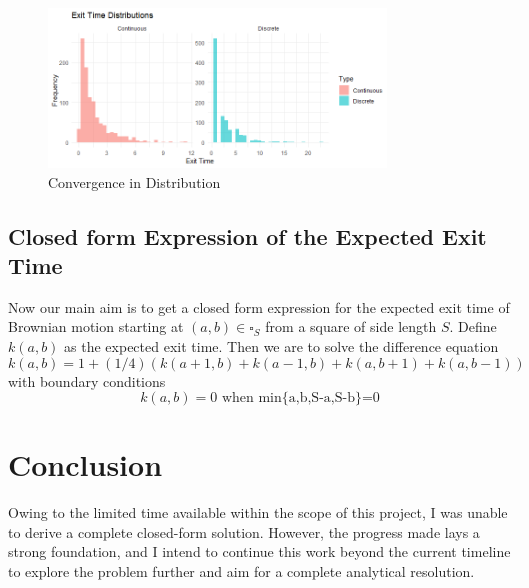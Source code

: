 \documentclass[11pt, a4paper, oneside]{report}
\numberwithin{equation}{section}
\begin{document}
\vspace{1 cm}
\begin{figure}[htbp]
    \centering
    \includegraphics[width=0.8\textwidth]{Distribution Convergence.png}
    \caption{Convergence in Distribution}
\end{figure}
\section{Closed form Expression of the Expected Exit Time}
Now our main aim is to get a closed form expression for the expected exit time of Brownian motion starting at $(a,b) \in \square_S$ from a square of side length $S$. Define $k(a,b)$ as the expected exit time. Then we are to solve the difference equation 
\[
k(a,b)=1+(1/4)(k(a+1,b)+k(a-1,b)+k(a,b+1)+k(a,b-1))
\]
with boundary conditions
\[
k(a,b)=0 \text{ when min\{a,b,S-a,S-b\}=0}
\]
\chapter{Conclusion}
Owing to the limited time available within the scope of this project, I was unable to derive a complete closed-form solution. However, the progress made lays a strong foundation, and I intend to continue this work beyond the current timeline to explore the problem further and aim for a complete analytical resolution.




\end{document}
